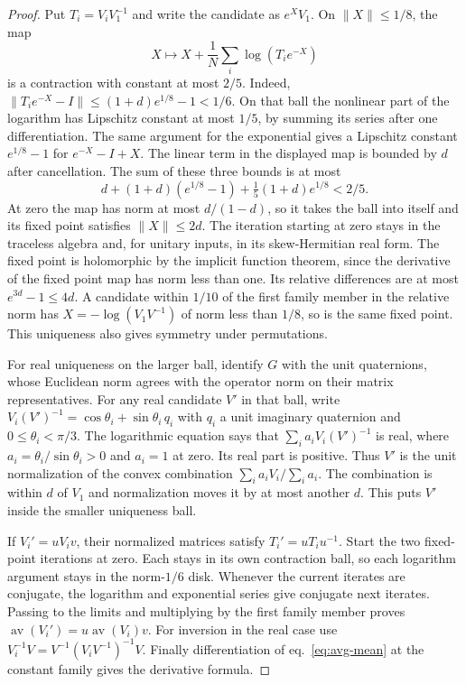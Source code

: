 \documentclass[11pt,letterpaper,reqno]{amsart}
\numberwithin{equation}{section}
\renewcommand{\eqref}[1]{\textup{eq.~\ref{#1}}}
\theoremstyle{definition}
\theoremstyle{remark}
\begin{document}
\begin{proof}
Put \(T_i=V_iV_1^{-1}\) and write the candidate as \(e^X V_1\).
On \(\|X\|\leq1/8\), the map
\[
 X\longmapsto X+\frac1N\sum_i\log(T_i e^{-X})
\]
is a contraction with constant at most \(2/5\).
Indeed, \(\|T_i e^{-X}-I\|\leq(1+d)e^{1/8}-1<1/6\).
On that ball the nonlinear part of the logarithm has Lipschitz
constant at most \(1/5\), by summing its series after one
differentiation. The same argument for the exponential gives a
Lipschitz constant \(e^{1/8}-1\) for \(e^{-X}-I+X\).
The linear term in the displayed map is bounded by \(d\) after
cancellation. The sum of these three bounds is at most
\[
 d+(1+d)(e^{1/8}-1)+\tfrac15(1+d)e^{1/8}<2/5 .
\]
At zero the map has norm at most \(d/(1-d)\), so it takes the ball
into itself and its fixed point satisfies \(\|X\|\leq 2d\).
The iteration starting at zero stays in the traceless algebra and,
for unitary inputs, in its skew-Hermitian real form. The fixed
point is holomorphic by the implicit function theorem, since the
derivative of the fixed point map has norm less than one.
Its relative differences are at most \(e^{3d}-1\leq4d\).
A candidate within \(1/10\) of the first family member in the
relative norm has \(X=-\log(V_1V^{-1})\) of norm less than \(1/8\),
so is the same fixed point. This uniqueness also gives symmetry
under permutations.

For real uniqueness on the larger ball, identify \(G\) with the
unit quaternions, whose Euclidean norm agrees with the operator norm
on their matrix representatives. For any real candidate \(V'\) in
that ball, write \(V_i(V')^{-1}=\cos\theta_i+\sin\theta_i\,q_i\)
with \(q_i\) a unit imaginary quaternion and \(0\leq\theta_i<\pi/3\).
The logarithmic equation says that
\(\sum_i a_i V_i(V')^{-1}\) is real, where
\(a_i=\theta_i/\sin\theta_i>0\) and \(a_i=1\) at zero. Its real
part is positive. Thus \(V'\) is the unit normalization of the
convex combination \(\sum_i a_i V_i/\sum_i a_i\). The combination
is within \(d\) of \(V_1\) and normalization moves it by at most
another \(d\). This puts \(V'\) inside the smaller uniqueness ball.

If \(V_i'=uV_iv\), their normalized matrices satisfy
\(T_i'=uT_i u^{-1}\). Start the two fixed-point iterations at zero.
Each stays in its own contraction ball, so each logarithm argument
stays in the norm-\(1/6\) disk. Whenever the current iterates are
conjugate, the logarithm and exponential series give conjugate
next iterates. Passing to the limits and multiplying by the first
family member proves
\(\operatorname{av}(V_i')=u\operatorname{av}(V_i)v\). For inversion in the real case use
\(V_i^{-1}V=V^{-1}(V_i V^{-1})^{-1}V\).
Finally differentiation of \eqref{eq:avg-mean} at the constant
family gives the derivative formula.
\end{proof}
\end{document}
